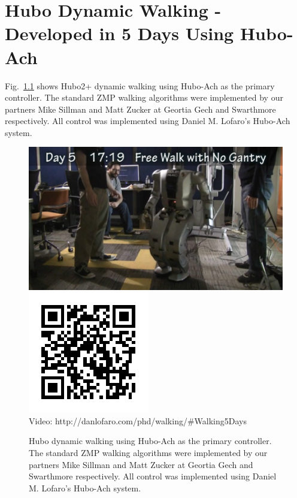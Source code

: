 \chapter{Hubo Dynamic Walking - Developed in 5 Days Using Hubo-Ach}\label{sec:dynamicWalking}
Fig.~\ref{fig:dynamicwalking} shows Hubo2+ dynamic walking using Hubo-Ach as the primary controller.  The standard ZMP walking algorithms were implemented by our partners Mike Sillman and Matt Zucker at Geortia Gech and Swarthmore respectively.  All control was implemented using Daniel M. Lofaro's Hubo-Ach system.

\begin{figure}[thpb]
  \centering
      \includegraphics[width=0.6\columnwidth]{./examples/pix/dynamicwalking.png}
      \includegraphics[width=0.3\columnwidth]{./qrcode/qrcode-dynamicwalking.png}\\
      Video: http://danlofaro.com/phd/walking/\#Walking5Days
\caption{Hubo dynamic walking using Hubo-Ach as the primary controller.  The standard ZMP walking algorithms were implemented by our partners Mike Sillman and Matt Zucker at Geortia Gech and Swarthmore respectively.  All control was implemented using Daniel M. Lofaro's Hubo-Ach system.}
  \label{fig:dynamicwalking}
\end{figure}